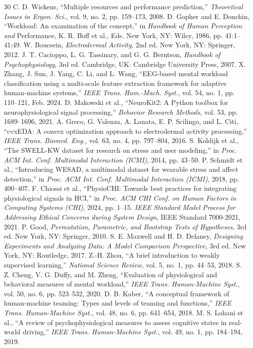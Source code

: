 \documentclass[journal]{IEEEtran}
\begin{document}
\begin{thebibliography}{30}
 C. D. Wickens, ``Multiple resources and performance prediction,'' \emph{Theoretical Issues in Ergon. Sci.}, vol. 9, no. 2, pp. 159--173, 2008.
 D. Gopher and E. Donchin, ``Workload: An examination of the concept,'' in \emph{Handbook of Human Perception and} \mbox{Performance,} K. R. Boff et al., Eds. New York, NY: Wiley, 1986, pp. 41:1--41:49.
 W. Boucsein, \emph{Electrodermal Activity}, 2nd ed. New York, NY: Springer, 2012.
 J. T. Cacioppo, L. G. Tassinary, and G. G. Berntson, \emph{Handbook of Psychophysiology}, 3rd ed. Cambridge, UK: Cambridge University Press, 2007.
 X. Zhang, J. Sun, J. Yang, C. Li, and L. Wang, ``EEG-based mental workload classification using a multi-scale feature extraction framework for adaptive human-machine systems,'' \emph{IEEE Trans. Hum.-Mach. Syst.}, vol. 54, no. 1, pp. 110--121, Feb. 2024.
 D. Makowski et al., ``NeuroKit2: A Python toolbox for neurophysiological signal processing,'' \emph{Behavior Research Methods}, vol. 53, pp. 1689--1696, 2021.
 A. Greco, G. Valenza, A. Lanata, E. P. Scilingo, and L. Citi, ``cvxEDA: A convex optimization approach to electrodermal activity processing,'' \emph{IEEE Trans. Biomed. Eng.}, vol. 63, no. 4, pp. 797--804, 2016.
 S. Koldijk et al., ``The SWELL-KW dataset for research on stress and user modeling,'' in \emph{Proc. ACM Int. Conf. Multimodal Interaction (ICMI)}, 2014, pp. 43--50.
 P. Schmidt et al., ``Introducing WESAD, a multimodal dataset for wearable stress and affect detection,'' in \emph{Proc. ACM Int. Conf. Multimodal Interaction (ICMI)}, 2018, pp. 400--407.
 F. Chiossi et al., ``PhysioCHI: Towards best practices for integrating physiological signals in HCI,'' in \emph{Proc. ACM CHI Conf. on Human Factors in Computing Systems (CHI)}, 2024, pp. 1--15.
 \emph{IEEE Standard Model Process for Addressing Ethical Concerns during System Design}, IEEE Standard 7000-2021, 2021.
 P. Good, \emph{Permutation, Parametric, and Bootstrap Tests of Hypotheses}, 3rd ed. New York, NY: Springer, 2010.
 S. E. Maxwell and H. D. Delaney, \emph{Designing Experiments and Analyzing Data: A Model Comparison Perspective}, 3rd ed. New York, NY: Routledge, 2017.
 Z.-H. Zhou, ``A brief introduction to weakly supervised learning,'' \emph{National Science Review}, vol. 5, no. 1, pp. 44--53, 2018.
 S. Z. Cheng, V. G. Duffy, and M. Zheng, ``Evaluation of physiological and behavioral measures of mental workload,'' \emph{IEEE Trans. Human-Machine Syst.}, vol. 50, no. 6, pp. 523--532, 2020.
 D. B. Kaber, ``A conceptual framework of human-machine teaming: Types and levels of teaming and functions,'' \emph{IEEE Trans. Human-Machine Syst.}, vol. 48, no. 6, pp. 641--654, 2018.
 M. S. Lohani et al., ``A review of psychophysiological measures to assess cognitive states in real-world driving,'' \emph{IEEE Trans. Human-Machine Syst.}, vol. 49, no. 1, pp. 184--194, 2019.
\end{thebibliography}
\end{document}
